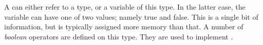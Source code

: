 A  can either refer to a type, or a variable of this type. In the latter case, the variable can have one of two values; namely true and false. This is a single bit of information, but is typically assigned more memory than that. A number of \textsl{boolean} operators are defined on this type. They are used to implement .
